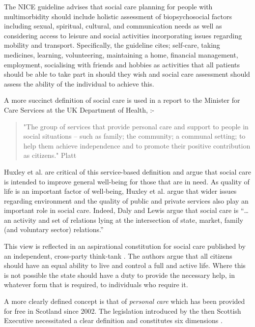 \documentclass[12pt,]{report}
\begin{document}
The NICE guideline \citeyearpar{RN150} advises that social care planning
for people with multimorbidity should include holistic assessment of
biopsychosocial factors including sexual, spiritual, cultural, and
communication needs as well as considering access to leisure and social
activities incorporating issues regarding mobility and transport.
Specifically, the guideline cites; self-care, taking medicines,
learning, volunteering, maintaining a home, financial management,
employment, socialising with friends and hobbies as activities that all
patients should be able to take part in should they wish and social care
assessment should assess the ability of the individual to achieve this.

A more succinct definition of social care is used in a report to the
Minister for Care Services at the UK Department of Health, :-

\begin{quotation}
    "The group of services that provide personal care and support to people in social situations – such as family; the community; a communal setting; to help them achieve independence and to promote their positive contribution as citizens." Platt 
\end{quotation}

\citeyearpar[pp.~4]{RN154}

Huxley et al. \citeyearpar{RN153} are critical of this service-based
definition and argue that social care is intended to improve general
well-being for those that are in need. As quality of life is an
important factor of well-being, Huxley et al. \citeyearpar{RN153} argue
that wider issues regarding environment and the quality of public and
private services also play an important role in social care. Indeed,
Daly and Lewis \citeyearpar[pp.287]{RN146} argue that social care is
``\ldots{}an activity and set of relations lying at the intersection of
state, market, family (and voluntary sector) relations.''

This view is reflected in an aspirational constitution for social care
published by an independent, cross-party think-tank \citep{RN136}. The
authors argue that all citizens should have an equal ability to live and
control a full and active life. Where this is not possible the state
should have a duty to provide the necessary help, in whatever form that
is required, to individuals who require it.

A more clearly defined concept is that of \emph{personal care} which has
been provided for free in Scotland since 2002. The legislation
introduced by the then Scottish Executive necessitated a clear
definition and constitutes six dimensions \citep[pp.256]{RN373}.
\end{document}
